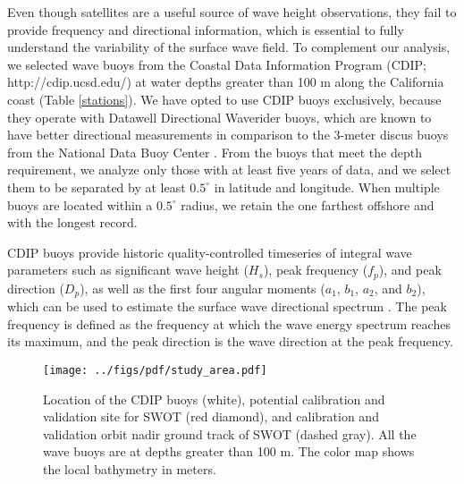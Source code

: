 Even though satellites are a useful source of wave height observations, they fail to provide 
frequency and directional information, which is essential to fully understand the variability of the surface wave field. To complement our analysis, we selected wave buoys from the Coastal Data Information Program (CDIP; http://cdip.ucsd.edu/) at water depths greater than 100 m along the California coast (Table \ref{stations}). We have opted to use CDIP buoys exclusively, because they operate with Datawell Directional Waverider buoys, which are known to have better directional measurements in comparison to the 3-meter discus buoys from the National Data Buoy Center \citep{o1996comparison}. 
From the buoys that meet the depth requirement, we analyze only those with at least five years of data, and we select them to be separated by at least $0.5^\circ$ in latitude and longitude. When multiple buoys are located within a $0.5^\circ$ radius, we retain the one farthest offshore and with the longest record.


CDIP buoys provide historic quality-controlled timeseries of integral wave parameters such as significant wave height ($H_s$), peak frequency ($f_p$), and peak direction ($D_p$), as well as the first four angular moments ($a_1$, $b_1$, $a_2$, and $b_2$), which can be used to estimate the surface wave directional spectrum \citep{longuet1963observations, long1980statistical}. The peak frequency is defined as the frequency at which the wave energy spectrum reaches its maximum, and the peak direction is the wave direction at the peak frequency.
\begin{figure}
\centering
\texttt{[image: ../figs/pdf/study\_area.pdf]}
\caption{Location of the CDIP buoys (white), potential calibration and validation site for SWOT (red diamond), and calibration and validation orbit nadir ground track of SWOT (dashed gray). All the wave buoys are at depths greater than 100 m. The color map shows the local bathymetry in meters.}
\label{study_area}
\end{figure}


